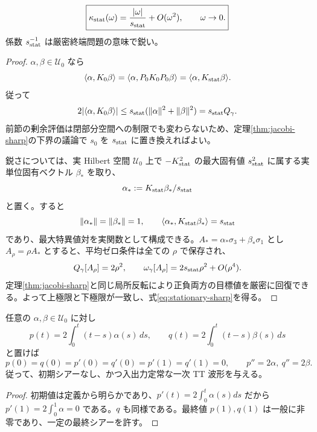 \begin{theorem}
\label{thm:stationary-sharp}
\begin{equation}
\boxed{\kappa_{\rm stat}(\omega)=\frac{|\omega|}{s_{\rm stat}}+O(\omega^2),\qquad \omega\to0.}
\label{eq:stationary-sharp}
\end{equation}
係数 $s_{\rm stat}^{-1}$ は厳密終端問題の意味で鋭い。
\end{theorem}
\begin{proof}
$\alpha,\beta\in\mathcal U_0$ なら
\[
\langle\alpha,K_0\beta\rangle
=\langle\alpha,P_0K_0P_0\beta\rangle
=\langle\alpha,K_{\rm stat}\beta\rangle.
\]
従って
\[
2|\langle\alpha,K_0\beta\rangle|
\le s_{\rm stat}(\|\alpha\|^2+\|\beta\|^2)
=s_{\rm stat}Q_\gamma.
\]
前節の剰余評価は閉部分空間への制限でも変わらないため、定理\ref{thm:jacobi-sharp}の下界の議論で $s_0$ を $s_{\rm stat}$ に置き換えればよい。

鋭さについては、実 Hilbert 空間 $\mathcal U_0$ 上で $-K_{\rm stat}^2$ の最大固有値 $s_{\rm stat}^2$ に属する実単位固有ベクトル $\beta_*$ を取り、
\[
\alpha_*:=K_{\rm stat}\beta_*/s_{\rm stat}
\]
と置く。すると
\[
\|\alpha_*\|=\|\beta_*\|=1,\qquad
\langle\alpha_*,K_{\rm stat}\beta_*\rangle=s_{\rm stat}
\]
であり、最大特異値対を実関数として構成できる。$A_*=\alpha_*\sigma_3+\beta_*\sigma_1$ とし $A_\rho=\rho A_*$ とすると、平均ゼロ条件は全ての $\rho$ で保存され、
\[
Q_\gamma[A_\rho]=2\rho^2,\qquad
\omega_\gamma[A_\rho]=2s_{\rm stat}\rho^2+O(\rho^4).
\]
定理\ref{thm:jacobi-sharp}と同じ局所反転により正負両方の目標値を厳密に回復できる。よって上極限と下極限が一致し、式\eqref{eq:stationary-sharp}を得る。
\end{proof}

\begin{lemma}[定常 TT ひずみによる実現]
\label{lem:physical-realization}
任意の $\alpha,\beta\in\mathcal U_0$ に対し
\begin{equation}
p(t)=2\int_0^t(t-s)\alpha(s)\,ds,\qquad
q(t)=2\int_0^t(t-s)\beta(s)\,ds
\label{eq:pq-from-control}
\end{equation}
と置けば
\[
p(0)=q(0)=p'(0)=q'(0)=p'(1)=q'(1)=0,
\qquad p''=2\alpha,\ q''=2\beta.
\]
従って、初期シアーなし、かつ入出力定常な一次 TT 波形を与える。
\end{lemma}
\begin{proof}
初期値は定義から明らかであり、$p'(t)=2\int_0^t\alpha(s)ds$ だから $p'(1)=2\int_0^1\alpha=0$ である。$q$ も同様である。最終値 $p(1),q(1)$ は一般に非零であり、一定の最終シアーを許す。
\end{proof}

